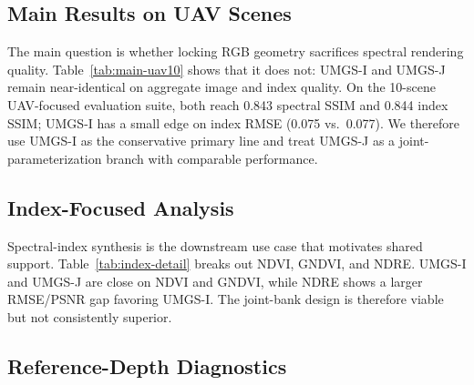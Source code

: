 \subsection{Main Results on UAV Scenes}

The main question is whether locking RGB geometry sacrifices spectral rendering quality. Table~\ref{tab:main-uav10} shows that it does not: UMGS-I and UMGS-J remain near-identical on aggregate image and index quality. On the 10-scene UAV-focused evaluation suite, both reach 0.843 spectral SSIM and 0.844 index SSIM; UMGS-I has a small edge on index RMSE (0.075 vs.\ 0.077). We therefore use UMGS-I as the conservative primary line and treat UMGS-J as a joint-parameterization branch with comparable performance.



\subsection{Index-Focused Analysis}

Spectral-index synthesis is the downstream use case that motivates shared support. Table~\ref{tab:index-detail} breaks out NDVI, GNDVI, and NDRE. UMGS-I and UMGS-J are close on NDVI and GNDVI, while NDRE shows a larger RMSE/PSNR gap favoring UMGS-I. The joint-bank design is therefore viable but not consistently superior.



\subsection{Reference-Depth Diagnostics}

